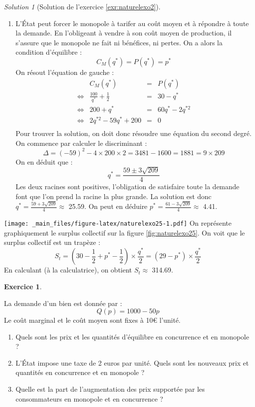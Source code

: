 \documentclass[
]{book}
\providecommand{\tightlist}{%
  \setlength{\itemsep}{0pt}\setlength{\parskip}{0pt}}
\theoremstyle{definition}
\theoremstyle{definition}
\theoremstyle{definition}
\newtheorem{exercise}{Exercice}[chapter]
\theoremstyle{definition}
\theoremstyle{remark}
\newtheorem*{solution}{Solution}
\begin{document}
\begin{solution}[Solution de l'exercice \ref{exr:naturelexo2}]
\begin{enumerate}
\def\labelenumi{\arabic{enumi}.}
\setcounter{enumi}{4}
\tightlist
\item
  L'État peut forcer le monopole à tarifer au coût moyen et à répondre à toute la demande.
  En l'obligeant à vendre à son coût moyen de production, il s'assure que le monopole ne fait ni bénéfices, ni pertes.
  On a alors la condition d'équilibre :
  \[C_M(q^*)=P(q^*)=p^*\]
  On résout l'équation de gauche :
  \[
  \begin{array}{crcl}
  &C_M(q^*)&=&P(q^*)\\
  \Leftrightarrow&\frac{100}{q^*}+\frac{1}{2}&=&30-q^*\\
  \Leftrightarrow&200+q^*&=&60q^*-2q^{*2}\\
  \Leftrightarrow&2q^{*2}-59q^*+200&=&0\\
  \end{array}
  \]
  Pour trouver la solution, on doit donc résoudre une équation du second degré.
  On commence par calculer le discriminant :
  \[\Delta=(-59)^2-4\times200\times2=3481-1600=1881=9\times209\]
  On en déduit que :
  \[q^*=\frac{59\pm3\sqrt{209}}{4}\]
  Les deux racines sont positives, l'obligation de satisfaire toute la demande font que l'on prend la racine la plus grande.
  La solution est donc \(q^*=\frac{59+3\sqrt{209}}{4}\approx\) 25.59.
  On peut en déduire \(p^*=\frac{61-3\sqrt{209}}{4}\approx\) 4.41.
\end{enumerate}

\texttt{[image: \_main\_files/figure-latex/naturelexo25-1.pdf]}
On représente graphiquement le surplus collectif sur la figure \ref{fig:naturelexo25}.
On voit que le surplus collectif est un trapèze : \[S_t=\left(30−\frac{1}{2}+p^*−\frac{1}{2}\right)×\frac{q^*}{2}=(29−p^*)\times \frac{q^*}{2}\]
En calculant (à la calculatrice), on obtient \(S_t\approx\) 314.69.

\end{solution}

\begin{exercise}
\protect\hypertarget{exr:naturelexo3}{}\label{exr:naturelexo3}

La demande d'un bien est donnée par : \[Q\left(p\right)=1000-50p\] Le coût
marginal et le coût moyen sont fixes à 10€ l'unité.

\begin{enumerate}
\def\labelenumi{\arabic{enumi}.}
\tightlist
\item
  Quels sont les prix et les quantités d'équilibre en concurrence
  et en monopole ?
\item
  L'État impose une taxe de 2 euros par unité. Quels sont les nouveaux prix et quantités en concurrence et en monopole ?
\item
  Quelle est la part de l'augmentation des prix supportée par les consommateurs en monopole et en concurrence ?
\end{enumerate}

\end{exercise}
\end{document}
